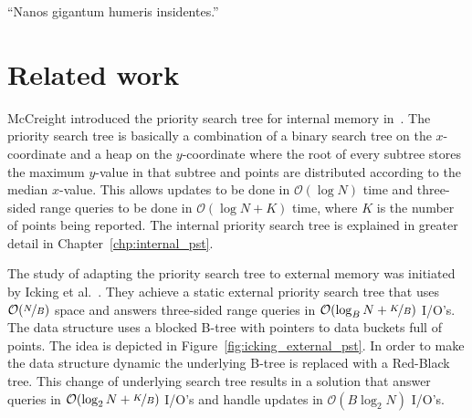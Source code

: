 \documentclass[twoside,11pt,openright]{report}
\newtheorem{lemma}{Lemma}
\begin{document}






\begin{savequote}[0.5\textwidth]
``Nanos gigantum humeris insidentes.''
\end{savequote}
\chapter{Related work}
\label{chp:related_work}
McCreight introduced the priority search tree for internal memory in~\cite{DBLP:journals/siamcomp/McCreight85}. The priority search tree is basically a combination of a binary search tree on the $x$-coordinate and a heap on the $y$-coordinate where the root of every subtree stores the maximum $y$-value in that subtree and points are distributed according to the median $x$-value. This allows updates to be done in $\mathcal{O}(\log N)$ time and three-sided range queries to be done in $\mathcal{O}(\log N + K)$ time, where $K$ is the number of points being reported. The internal priority search tree is explained in greater detail in Chapter~\ref{chp:internal_pst}.

The study of adapting the priority search tree to external memory was initiated by Icking et al.~\cite{Icking1988}. They achieve a static external priority search tree that uses $\mathcal{O}(\nicefrac{N}{B})$ space and answers three-sided range queries in $\mathcal{O}(\log_B N + \nicefrac{K}{B})$ I/O's. The data structure uses a blocked B-tree with pointers to data buckets full of points. The idea is depicted in Figure~\ref{fig:icking_external_pst}. In order to make the data structure dynamic the underlying B-tree is replaced with a Red-Black tree. This change of underlying search tree results in a solution that answer queries in $\mathcal{O}(\log_2 N + \nicefrac{K}{B})$ I/O's and handle updates in $\mathcal{O}(B \log_2 N)$ I/O's.
\end{document}
